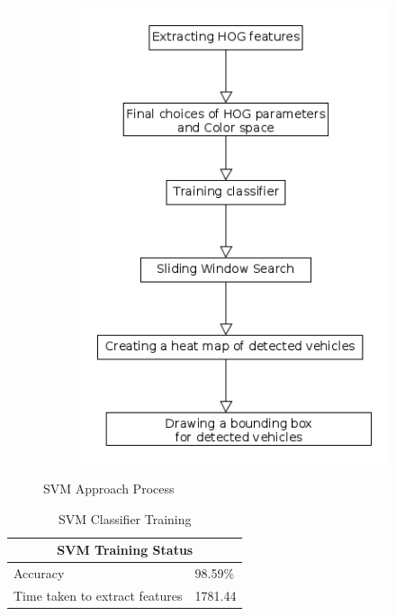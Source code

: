 \documentclass[conference]{IEEEtran}
\begin{document}
\begin{figure}[h]
	\centering
	\begin{subfigure}[t]{0.3\textwidth} 
		\centering
		\includegraphics[scale=0.3]{figures/svm_approach_process.png}
	\end{subfigure}%
	\caption{SVM Approach Process}
	\label{SAP}
\end{figure}

\begin{table}[ht]
\begin{center}
	\begin{tabular}{ |p{3cm}|p{1cm}| }
		\hline
		\multicolumn{2}{|c|}{SVM Training Status} \\
		\hline
		 Accuracy    &  98.59\% \\
		\hline
		Time taken to extract features & 1781.44\\
		\hline
	\end{tabular}
\end{center}
\caption{SVM Classifier Training}
\end{table}

\ifCLASSOPTIONcaptionsoff
  \newpage
\fi
\end{document}
